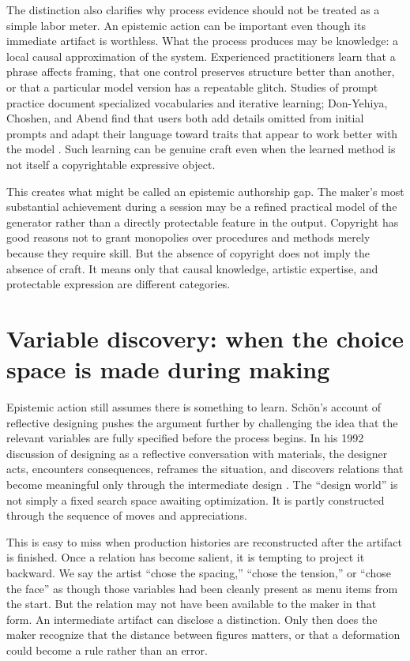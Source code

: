 \documentclass[11pt]{article}
\begin{document}
The distinction also clarifies why process evidence should not be treated as a simple labor meter. An epistemic action can be important even though its immediate artifact is worthless. What the process produces may be knowledge: a local causal approximation of the system. Experienced practitioners learn that a phrase affects framing, that one control preserves structure better than another, or that a particular model version has a repeatable glitch. Studies of prompt practice document specialized vocabularies and iterative learning; Don-Yehiya, Choshen, and Abend find that users both add details omitted from initial prompts and adapt their language toward traits that appear to work better with the model \citep{DonYehiyaEtAl2023}. Such learning can be genuine craft even when the learned method is not itself a copyrightable expressive object.

This creates what might be called an epistemic authorship gap. The maker's most substantial achievement during a session may be a refined practical model of the generator rather than a directly protectable feature in the output. Copyright has good reasons not to grant monopolies over procedures and methods merely because they require skill. But the absence of copyright does not imply the absence of craft. It means only that causal knowledge, artistic expertise, and protectable expression are different categories.

\section{Variable discovery: when the choice space is made during making}

Epistemic action still assumes there is something to learn. Sch\"on's account of reflective designing pushes the argument further by challenging the idea that the relevant variables are fully specified before the process begins. In his 1992 discussion of designing as a reflective conversation with materials, the designer acts, encounters consequences, reframes the situation, and discovers relations that become meaningful only through the intermediate design \citep{Schon1992Reflective}. The ``design world'' is not simply a fixed search space awaiting optimization. It is partly constructed through the sequence of moves and appreciations.

This is easy to miss when production histories are reconstructed after the artifact is finished. Once a relation has become salient, it is tempting to project it backward. We say the artist ``chose the spacing,'' ``chose the tension,'' or ``chose the face'' as though those variables had been cleanly present as menu items from the start. But the relation may not have been available to the maker in that form. An intermediate artifact can disclose a distinction. Only then does the maker recognize that the distance between figures matters, or that a deformation could become a rule rather than an error.
\end{document}
